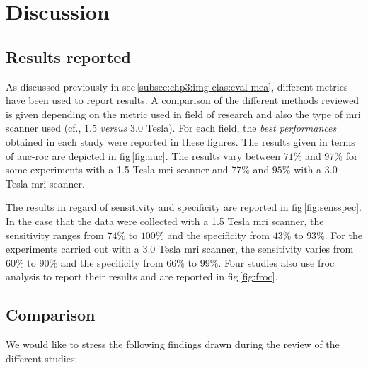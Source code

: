 \section{Discussion}\label{sec:chp3:dis}


\subsection{Results reported}\label{subsec:chp3:dis:res}

As discussed previously in \ac{sec}\,\ref{subsec:chp3:img-clas:eval-mea}, different metrics have been used to report results.
A comparison of the different methods reviewed is given depending on the metric used in field of research and also the type of \ac{mri} scanner used (cf., 1.5 \textit{versus} 3.0 Tesla).
For each field, the \textit{best performances} obtained in each study were reported in these figures.
The results given in terms of \ac{auc}-\ac{roc} are depicted in \ac{fig}\,\ref{fig:auc}.
The results vary between $71\%$ and $97\%$ for some experiments with a 1.5 Tesla \ac{mri} scanner and $77\%$ and $95\%$ with a 3.0 Tesla \ac{mri} scanner. 

The results in regard of sensitivity and specificity are reported in \ac{fig}\,\ref{fig:sensspec}.
In the case that the data were collected with a 1.5 Tesla \ac{mri} scanner, the sensitivity ranges from $74\%$ to $100\%$ and the specificity from $43\%$ to $93\%$.
For the experiments carried out with a 3.0 Tesla \ac{mri} scanner, the sensitivity varies from $60\%$ to $90\%$ and the specificity from $66\%$ to $99\%$.
Four studies also use \ac{froc} analysis to report their results and are reported in \ac{fig}\,\ref{fig:froc}.

\subsection{Comparison}\label{subsec:chp3:dis:com}

We would like to stress the following findings drawn during the review of the different studies:

